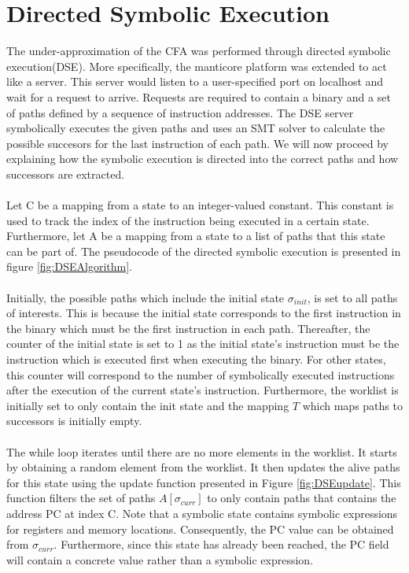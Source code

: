 \documentclass{kththesis}
\begin{document}
\section{Directed Symbolic Execution}
The under-approximation of the CFA was performed through directed symbolic execution(DSE). More specifically, the manticore platform was extended to act like a server. This server would listen to a user-specified port on localhost and wait for a request to arrive. Requests are required to contain a binary and a set of paths defined by a sequence of instruction addresses. The DSE server symbolically executes the given paths and uses an SMT solver to calculate the possible succesors for the last instruction of each path. We will now proceed by explaining how the symbolic execution is directed into the correct paths and how successors are extracted.
\\ \\
Let C be a mapping from a state to an integer-valued constant. This constant is used to track the index of the instruction being executed in a certain state. Furthermore, let A be a mapping from a state to a list of paths that this state can be part of. The pseudocode of the directed symbolic execution is presented in figure \ref{fig:DSEAlgorithm}.
\\ \\
Initially, the possible paths which include the initial state $\sigma_{init}$, is set to all paths of interests. This is because the initial state corresponds to the first instruction in the binary which must be the first instruction in each path. Thereafter, the counter of the initial state is set to 1 as the initial state's instruction must be the instruction which is executed first when executing the binary. For other states, this counter will correspond to the number of symbolically executed instructions after the execution of the current state's instruction. Furthermore, the worklist is initially set to only contain the init state and the mapping $T$ which maps paths to successors is initially empty. 
\\ \\
The while loop iterates until there are no more elements in the worklist. It starts by obtaining a random element from the worklist. It then updates the alive paths for this state using the update function presented in Figure \ref{fig:DSEupdate}. This function filters the set of paths $A[\sigma_{curr}]$ to only contain paths that contains the address PC at index C. Note that a symbolic state contains symbolic expressions for registers and memory locations. Consequently, the PC value can be obtained from $\sigma_{curr}$. Furthermore, since this state has already been reached, the PC field will contain a concrete value rather than a symbolic expression.
\end{document}
